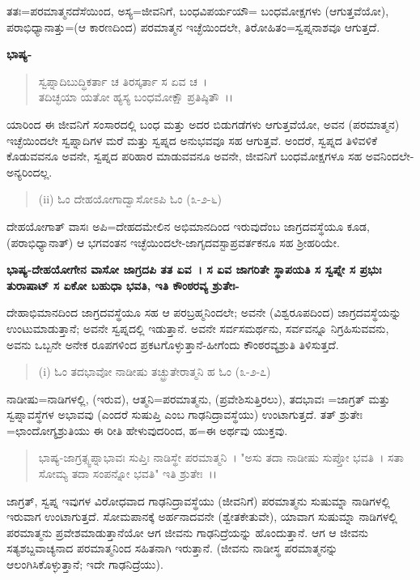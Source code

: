 ತತಃ=ಪರಮಾತ್ಮನದೆಸೆಯಿಂದ, ಅಸ್ಯ=ಜೀವನಿಗೆ, ಬಂಧವಿಪರ್ಯಯೌ= ಬಂಧಮೋಕ್ಷಗಳು (ಆಗುತ್ತವೆಯೋ), ಪರಾಭಿಧ್ಯಾನಾತ್ತು=(ಆ ಕಾರಣದಿಂದ) ಪರಮಾತ್ಮನ ಇಚ್ಛೆಯಿಂದಲೇ, ತಿರೋಹಿತಂ=ಸ್ವಪ್ನನಾಶವೂ ಆಗುತ್ತದೆ.

\noindent
\textbf{ಭಾಷ್ಯ-}

\begin{verse}
ಸ್ವಪ್ನಾದಿಬುದ್ಧಿಕರ್ತಾ ಚ ತಿರಸ್ಕರ್ತಾ ಸ ಏವ ಚ~।\\ ತದಿಚ್ಛಯಾ ಯತೋ ಹ್ಯಸ್ಯ ಬಂಧಮೋಕ್ಷೌ ಪ್ರತಿಷ್ಠಿತೌ~।।
\end{verse}


ಯಾರಿಂದ ಈ ಜೀವನಿಗೆ ಸಂಸಾರದಲ್ಲಿ ಬಂಧ ಮತ್ತು ಅದರ ಬಿಡುಗಡೆಗಳು ಆಗುತ್ತವೆಯೋ, ಅವನ (ಪರಮಾತ್ಮನ) ಇಚ್ಛೆಯಿಂದಲೇ ಸ್ವಪ್ನಾದಿಗಳ ಮರೆ ಮತ್ತು ಸ್ವಪ್ನದ ಅನುಭವವೂ ಸಹ ಆಗುತ್ತವೆ. ಅಂದರೆ, ಸ್ವಪ್ನದ ತಿಳಿವಳಿಕೆ ಕೊಡುವವನೂ ಅವನೇ, ಸ್ವಪ್ನದ ಪರಿಹಾರ ಮಾಡುವವನೂ ಅವನೇ, ಜೀವನಿಗೆ ಬಂಧಮೋಕ್ಷಗಳೂ ಸಹ ಅವನಿಂದಲೇ-ಅನ್ಯರಿಂದಲ್ಲ.

\begin{verse}
(ii) ಓಂ ದೇಹಯೋಗಾದ್ವಾಸೋಽಪಿ ಓಂ (೩-೨-೬)
\end{verse}

ದೇಹಯೋಗಾತ್ ವಾಸಃ ಅಪಿ=ದೇಹದಮೇಲಿನ ಅಭಿಮಾನದಿಂದ ಇರುವುದೆಂಬ ಜಾಗ್ರದವಸ್ಥೆಯೂ ಕೂಡ, (ಪರಾಭಿಧ್ಯಾನಾತ್) ಆ ಭಗವಂತನ ಇಚ್ಛೆಯಿಂದಲೇ-ಜಾಗೃದವಸ್ಟಾಪ್ರವರ್ತಕನೂ ಸಹ ಶ‍್ರೀಹರಿಯೇ.

\textbf{ಭಾಷ್ಯ-ದೇಹಯೋಗೇನ ವಾಸೋ ಜಾಗ್ರದಪಿ ತತ ಏವ~। ಸ ಏವ ಜಾಗರಿತೇ ಸ್ಥಾಪಯತಿ ಸ ಸ್ವಪ್ನೇ ಸ ಪ್ರಭುಃ ತುರಾಷಾಟ್ ಸ ಏಕೋ ಬಹುಧಾ ಭವತಿ, ಇತಿ ಕೌಂಠರವ್ಯ ಶ್ರುತೇಃ-}

ದೇಹಾಭಿಮಾನದಿಂದ ಜಾಗ್ರದವಸ್ಥೆಯೂ ಸಹ ಆ ಪರಬ್ರಹ್ಮನಿಂದಲೇ; ಅವನೇ (ವಿಶ್ವರೂಪದಿಂದ) ಜಾಗ್ರದವಸ್ಥೆಯನ್ನು ಉಂಟುಮಾಡುತ್ತಾನೆ; ಅವನೇ ಸ್ವಪ್ನದಲ್ಲಿ ಇಡುತ್ತಾನೆ. ಅವನೇ ಸರ್ವಸಮರ್ಥನು, ಸರ್ವವನ್ನೂ ನಿಗ್ರಹಿಸುವವನು, ಅವನು ಒಬ್ಬನೇ ಅನೇಕ ರೂಪಗಳಿಂದ ಪ್ರಕಟಗೊಳ್ಳುತ್ತಾನೆ-ಹೀಗೆಂದು ಕೌಂಠರವ್ಯಶ್ರುತಿ ತಿಳಿಸುತ್ತದೆ.

\begin{verse}
(i) ಓಂ ತದಭಾವೋ ನಾಡೀಷು ತಚ್ಛ್ರುತೇರಾತ್ಮನಿ ಹ ಓಂ (೩-೨-೭)
\end{verse}

ನಾಡೀಷು=ನಾಡಿಗಳಲ್ಲಿ, (ಇರುವ), ಆತ್ಮನಿ=ಪರಮಾತ್ಮನು, (ಪ್ರವೇಶಿಸುತ್ತಿರಲು), ತದಭಾವಃ =ಜಾಗ್ರತ್ ಮತ್ತು ಸ್ವಪ್ನಾವಸ್ಥೆಗಳ ಅಭಾವವು (ಎಂದರೆ ಸುಷುಪ್ತಿ ಎಂಬ ಗಾಢನಿದ್ರಾವಸ್ಥೆಯು) ಉಂಟಾಗುತ್ತದೆ. ತತ್ ಶ್ರುತೇಃ =ಛಾಂದೋಗ್ಯಶ್ರುತಿಯು ಈ ರೀತಿ ಹೇಳುವುದರಿಂದ, ಹ=ಈ ಅರ್ಥವು ಯುಕ್ತವು.

\begin{verse}
ಭಾಷ್ಯ-ಜಾಗ್ರತ್ಸ್ವಪ್ನಾಭಾವಃ ಸುಪ್ತಿಃ ನಾಡಿಸ್ಥೇ ಪರಮಾತ್ಮನಿ~। "ಅಸು ತದಾ ನಾಡೀಷು ಸುಪ್ತೋ ಭವತಿ~। ಸತಾ ಸೋಮ್ಯ ತದಾ ಸಂಪನ್ನೋ ಭವತಿ" ಇತಿ ಶ್ರುತೇಃ~।।
\end{verse}

ಜಾಗ್ರತ್, ಸ್ವಪ್ನ ಇವುಗಳ ವಿರೋಧವಾದ ಗಾಢನಿದ್ರಾವಸ್ಥೆಯು (ಜೀವನಿಗೆ) ಪರಮಾತ್ಮನು ಸುಷುಮ್ನಾ ನಾಡಿಗಳಲ್ಲಿ ಇರುವಾಗ ಉಂಟಾಗುತ್ತದೆ. ಸೋಮಪಾನಕ್ಕೆ ಅರ್ಹನಾದವನೇ (ಶ್ವೇತಕೇತುವೇ), ಯಾವಾಗ ಸುಷುಮ್ನಾ ನಾಡಿಗಳಲ್ಲಿ ಪರಮಾತ್ಮನು ಪ್ರವೇಶಮಾಡುತ್ತಾನೆಯೋ ಆಗ ಜೀವನು ಗಾಢನಿದ್ರೆಯನ್ನು ಹೊಂದುತ್ತಾನೆ. ಆಗ ಆ ಜೀವನು ಸತ್ಯಶಬ್ದವಾಚ್ಯನಾದ ಪರಮಾತ್ಮನಿಂದ ಸಹಿತನಾಗಿ ಇರುತ್ತಾನೆ. (ಜೀವನು ನಾಡೀಸ್ಥ ಪರಮಾತ್ಮನನ್ನು ಆಲಂಗಿಸಿಕೊಳ್ಳುತ್ತಾನೆ; ಇದೇ ಗಾಢನಿದ್ರೆಯು).

